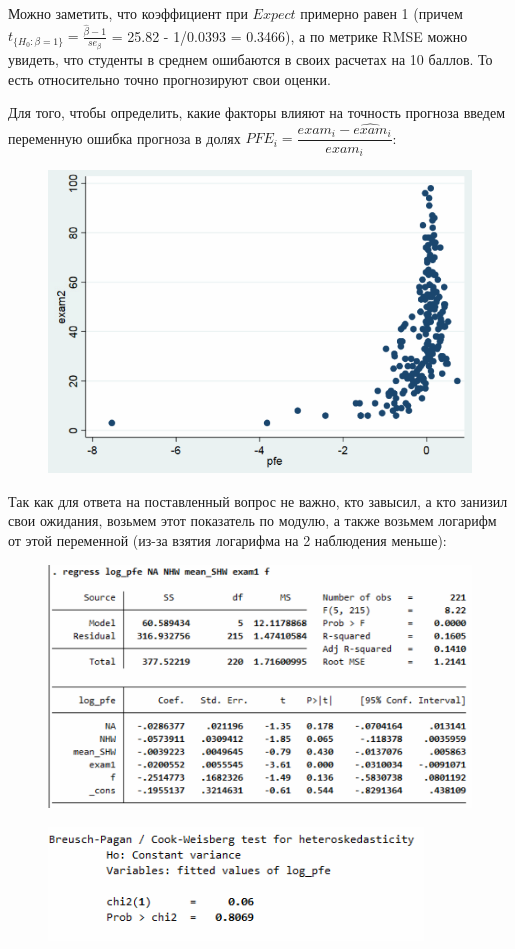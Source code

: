 \documentclass[12pt,a4paper, oneside]{extreport}
\begin{document}
Можно заметить, что коэффициент при $Expect$ примерно равен 1 (причем $t_{\{H_0:\beta = 1\}} = \frac{\hat{\beta} - 1}{se_{\beta}}$ = 25.82 - 1/0.0393 = 0.3466), а по метрике RMSE можно увидеть, что студенты в среднем ошибаются в своих расчетах на 10 баллов. То есть относительно точно прогнозируют свои оценки.

Для того, чтобы определить, какие факторы влияют на точность прогноза введем переменную    ошибка прогноза в долях $PFE_i = \dfrac{exam_i - \widehat{exam}_i}{exam_i}$:  

\begin{figure}[h!]
	\centering
	\includegraphics[width=0.6\linewidth]{screenshot016}
	\label{fig:screenshot016}
\end{figure}

\newpage

Так как для ответа на поставленный вопрос не важно, кто завысил, а кто занизил свои ожидания, возьмем этот показатель по модулю, а также возьмем логарифм от этой переменной (из-за взятия логарифма на 2 наблюдения меньше):


\begin{figure}[h!]
	\centering
	\includegraphics[width=0.7\linewidth]{screenshot017}
	\label{fig:screenshot017}
\end{figure}


\begin{figure}[h!]
	\centering
	\includegraphics{screenshot018}
	\label{fig:screenshot018}
\end{figure}
\end{document}
